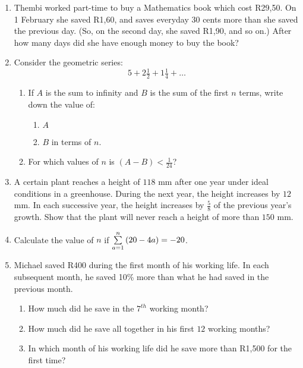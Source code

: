 \begin{enumerate}
\item Thembi worked part-time to buy a Mathematics book which cost R29,50. On 1 February she saved R1,60, and saves everyday 30 cents more than she saved the previous day. (So, on the second day, she saved R1,90, and so on.) After how many days did she have enough money to buy the book?

\item Consider the geometric series: $$5 + 2\tfrac{1}{2} + 1\tfrac{1}{4} + \ldots $$
\begin{enumerate}
\item If $A$ is the sum to infinity and $B$ is the sum of the first $n$ terms, write down the value of:
\begin{enumerate}
\item $A$
\item $B$ in terms of $n$.
\end{enumerate}

\item For which values of $n$ is $(A - B) < \tfrac{1}{24}$?
\end{enumerate}

\item A certain plant reaches a height of $118$ mm after one year under ideal conditions in a greenhouse. During the next year, the height increases by $12$ mm. In each successive year, the height increases by $\tfrac{5}{8}$ of the previous year's growth. Show that the plant will never reach a height of more than $150$ mm.

\item Calculate the value of $n$ if $\sum_{a=1}^n \limits \, (20 - 4a) = -20$.

\item Michael saved R400 during the first month of his working life. In each subsequent month, he saved 10\% more than what he had saved in the previous month.
\begin{enumerate}
\item How much did he save in the $7^{th}$ working month?
\item How much did he save all together in his first $12$ working months?
\item In which month of his working life did he save more than R1,500 for the first time?
\end{enumerate}


\end{enumerate}

